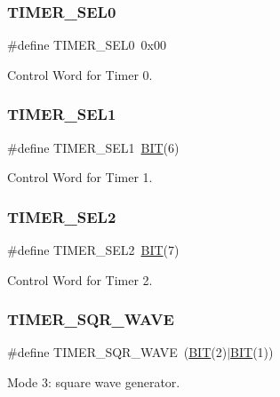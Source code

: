 \mbox{\label{group__i8254_ga6a4822642d40c248435692324a818010}} 
\subsubsection{\texorpdfstring{TIMER\_SEL0}{TIMER\_SEL0}}
{\footnotesize\ttfamily \#define T\+I\+M\+E\+R\+\_\+\+S\+E\+L0~0x00}



Control Word for Timer 0. 

\mbox{\label{group__i8254_ga8349623fd8d99f9cc5d8ae29d78594fc}} 
\subsubsection{\texorpdfstring{TIMER\_SEL1}{TIMER\_SEL1}}
{\footnotesize\ttfamily \#define T\+I\+M\+E\+R\+\_\+\+S\+E\+L1~\mbox{\hyperlink{realtimeclock_8h_a3a8ea58898cb58fc96013383d39f482c}{B\+IT}}(6)}



Control Word for Timer 1. 

\mbox{\label{group__i8254_ga142a255de0dbc48aeabd45fc10c33672}} 
\subsubsection{\texorpdfstring{TIMER\_SEL2}{TIMER\_SEL2}}
{\footnotesize\ttfamily \#define T\+I\+M\+E\+R\+\_\+\+S\+E\+L2~\mbox{\hyperlink{realtimeclock_8h_a3a8ea58898cb58fc96013383d39f482c}{B\+IT}}(7)}



Control Word for Timer 2. 

\mbox{\label{group__i8254_ga4745cbf21da3d3fea5dbb080b2b73bac}} 
\subsubsection{\texorpdfstring{TIMER\_SQR\_WAVE}{TIMER\_SQR\_WAVE}}
{\footnotesize\ttfamily \#define T\+I\+M\+E\+R\+\_\+\+S\+Q\+R\+\_\+\+W\+A\+VE~(\mbox{\hyperlink{realtimeclock_8h_a3a8ea58898cb58fc96013383d39f482c}{B\+IT}}(2)$\vert$\mbox{\hyperlink{realtimeclock_8h_a3a8ea58898cb58fc96013383d39f482c}{B\+IT}}(1))}



Mode 3\+: square wave generator. 

